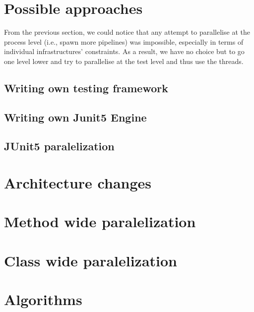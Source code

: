 \section{Possible approaches}

From the previous section, we could notice that any attempt to parallelise at the process level (i.e., spawn more pipelines) was impossible, especially in terms of individual infrastructures' constraints. As a result, we have no choice but to go one level lower and try to parallelise at the test level and thus use the threads.

\subsection{Writing own testing framework}
\subsection{Writing own Junit5 Engine}
\subsection{JUnit5 paralelization}

\section{Architecture changes} %
\section{Method wide paralelization}
\section{Class wide paralelization}
\section{Algorithms} 

